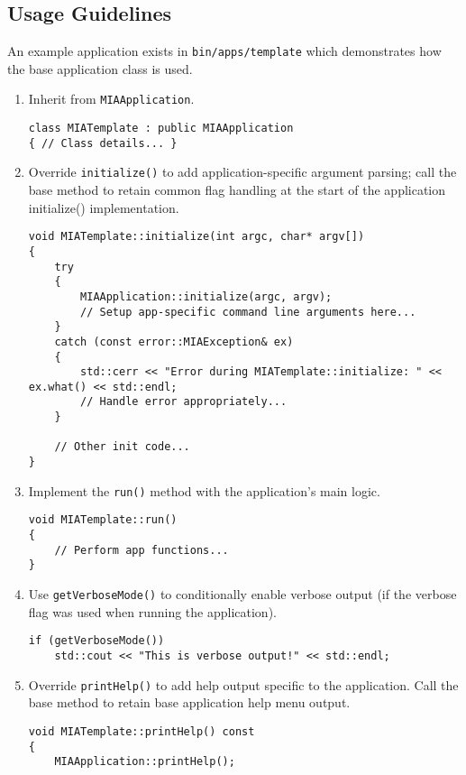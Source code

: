 \subsection*{Usage Guidelines}
An example application exists in \texttt{bin/apps/template} which demonstrates how the base application class is used.
\begin{enumerate}
	\item Inherit from \texttt{MIAApplication}.
	\begin{lstlisting}[style=cppstyle]
class MIATemplate : public MIAApplication
{ // Class details... }
	\end{lstlisting}
 
	\item Override \texttt{initialize()} to add application-specific argument parsing; call the base method to retain common flag handling at the start of the application initialize() implementation.
	\begin{lstlisting}[style=cppstyle]
void MIATemplate::initialize(int argc, char* argv[])
{
	try
	{    
		MIAApplication::initialize(argc, argv);	
		// Setup app-specific command line arguments here...
	}
	catch (const error::MIAException& ex)
	{
		std::cerr << "Error during MIATemplate::initialize: " << ex.what() << std::endl;
		// Handle error appropriately...
	}
	
	// Other init code...
}
	\end{lstlisting}
 
	\item Implement the \texttt{run()} method with the application's main logic.
	\begin{lstlisting}[style=cppstyle]
void MIATemplate::run()
{
	// Perform app functions...
}
	\end{lstlisting}
 
	\item Use \texttt{getVerboseMode()} to conditionally enable verbose output (if the verbose flag was used when running the application).
	\begin{lstlisting}[style=cppstyle]
if (getVerboseMode())
    std::cout << "This is verbose output!" << std::endl;
	\end{lstlisting}
 
	\item Override \texttt{printHelp()} to add help output specific to the application. Call the base method to retain base application help menu output.
	\begin{lstlisting}[style=cppstyle]
void MIATemplate::printHelp() const
{
    MIAApplication::printHelp();
    

\end{lstlisting}
\end{enumerate}

